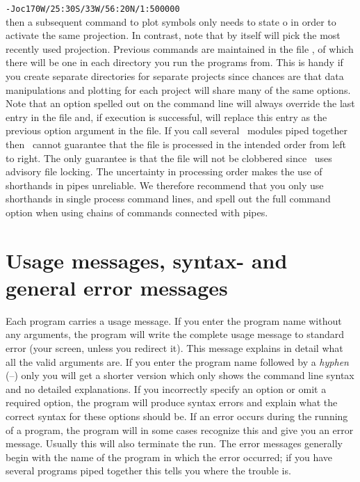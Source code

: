\texttt{-Joc170W/25:30S/33W/56:20N/1:500000} \\ 

\vspace{\baselineskip} 
\noindent
then a subsequent  command to plot symbols only needs
to state o in order to activate the same projection.  In
contrast, note that  by itself will pick the most recently used projection.
Previous commands are maintained in the file ,
of which there will be one in each directory you run the programs
from.  This is handy if you create separate directories for
separate projects since chances are that data manipulations
and plotting for each project will share many of the same options.
Note that an option spelled out on the command line will always
override the last entry in the  file and,
if execution is successful, will replace this entry as the
previous option argument in the  file.
If you call several \GMT\ modules piped together then \GMT\ cannot
guarantee that the  file is processed
in the intended order from left to right.  The only guarantee
is that the file will not be clobbered since \GMT\ uses advisory
file locking.  The uncertainty in processing order makes the use
of shorthands in pipes unreliable.  We therefore recommend that you
only use shorthands in single process command lines, and spell out
the full command option when using chains of commands connected with
pipes.

\section{Usage messages, syntax- and general error messages}

Each program carries a usage message.  If you enter the program
name without any arguments, the program will write the complete
usage message to standard error (your screen, unless you
redirect it).  This message explains in detail what all the
valid arguments are.  If you enter the program name followed
by a \emph{hyphen} (--) only you will get a shorter version
which only shows the command line syntax and no detailed
explanations.  If you incorrectly specify an option or omit
a required option, the program will produce syntax errors and
explain what the correct syntax for these options should be.
If an error occurs during the running of a program, the
program will in some cases recognize this and give you an
error message.  Usually this will also terminate the run.
The error messages generally begin with the name of the
program in which the error occurred; if you have several
programs piped together this tells you where the trouble is. 

